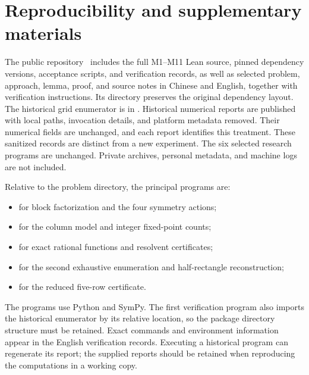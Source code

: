 \section{Reproducibility and supplementary materials}\label{app:repro}

The public repository~\cite{repository} includes the full M1--M11 Lean
source, pinned dependency versions, acceptance scripts, and verification
records, as well as selected problem,
approach, lemma, proof, and source notes in Chinese and English,
together with verification instructions.
Its 
directory preserves the original dependency layout.
The historical grid enumerator is in
.
Historical numerical reports are published with local paths,
invocation details, and platform metadata removed. Their numerical
fields are unchanged, and each report identifies this treatment.
These sanitized records are distinct from a new experiment.
The six selected research programs are unchanged. Private archives,
personal metadata, and machine logs are not included.

Relative to the problem directory, the principal programs are:
\begin{itemize}
\item {}
for block factorization and the four symmetry actions;
\item {}
for the column model and integer fixed-point counts;
\item {}
for exact rational functions and resolvent certificates;
\item {}
for the second exhaustive enumeration and half-rectangle reconstruction;
\item {}
for the reduced five-row certificate.
\end{itemize}

The programs use Python and SymPy. The first verification
program also imports the historical enumerator by its
relative location, so the package directory structure must
be retained. Exact commands and environment information
appear in the English verification records.
Executing a historical program can regenerate its report;
the supplied reports should be retained when reproducing
the computations in a working copy.

